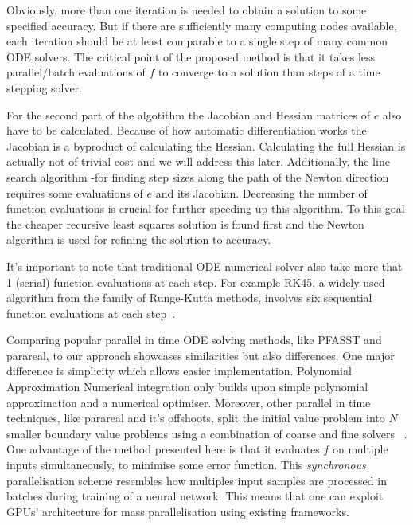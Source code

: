 \documentclass[11pt]{report}
\begin{document}
    Obviously, more than one iteration is needed to obtain a solution to some specified accuracy.
    But if there are sufficiently many computing nodes available, each iteration should be at least comparable to a
    single step of many common ODE solvers.
    The critical point of the proposed method is that it takes less parallel/batch evaluations of $f$ to converge to a solution
    than steps of a time stepping solver.

    For the second part of the algotithm the Jacobian and Hessian matrices of $e$ also have to be calculated.
    Because of how automatic differentiation works the Jacobian is a byproduct of calculating the Hessian.
    Calculating the full Hessian is actually not of trivial cost and we will address this later.
    Additionally, the line search algorithm -for finding step sizes along the path of the Newton direction requires
    some evaluations of $e$ and its Jacobian.
    Decreasing the number of function evaluations is crucial for further speeding up this algorithm.
    To this goal the cheaper recursive least squares solution is found first and the Newton algorithm is used for
    refining the solution to accuracy.

    It's important to note that traditional ODE numerical solver also take more that 1 (serial) function evaluations at
    each step.
    For example RK45, a widely used algorithm from the family of Runge-Kutta methods, involves six sequential function
    evaluations at each step~\cite{suli2010numerical}.

    Comparing popular parallel in time ODE solving methods, like PFASST and parareal, to our approach showcases
    similarities but also differences.
    One major difference is simplicity which allows easier implementation.
    Polynomial Approximation Numerical integration only builds upon simple polynomial approximation and a numerical
    optimiser.
    Moreover, other parallel in time techniques, like parareal and it's offshoots, split the initial value problem into
    $N$ smaller boundary value problems using a combination of coarse and fine solvers ~\cite{maday2002parareal}.
    One advantage of the method presented here is that it evaluates $f$ on multiple inputs simultaneously,
    to minimise some error function.
    This \textit{synchronous} parallelisation scheme resembles how multiples input samples are processed in batches
    during training of a neural network.
    This means that one can exploit GPUs' architecture for mass parallelisation using existing frameworks.
\end{document}
